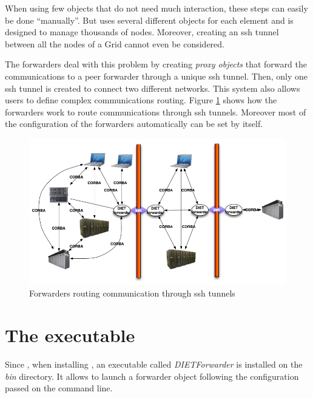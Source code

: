 When using few objects that do not need much interaction, these steps
can easily be done ``manually''. But \diet uses several different
objects for each element and is designed to manage thousands of nodes.
Moreover, creating an ssh tunnel between all the nodes of a Grid
cannot even be considered.

The \diet forwarders deal with this problem by creating \textit{proxy
  objects} that forward the communications to a peer forwarder through
a unique ssh tunnel. Then, only one ssh tunnel is created to connect
two different networks. This system also allows users to define complex
communications routing. Figure \ref{fig:forwarder} shows how the \diet
forwarders work to route communications through ssh tunnels. Moreover
most of the configuration of the forwarders automatically can be set
by \diet itself.

\begin{figure}[htp]
\begin{center}
  \includegraphics[width=12cm]{fig/Forwarder}
\end{center}
\caption{Forwarders routing \diet communication through ssh tunnels
  \label{fig:forwarder}}
\end{figure}

\section{The \dietforwarder executable}
\label{sec:ForwarderConfig}
Since , when installing \diet, an executable called \textit{DIETForwarder}
is installed on the \textit{bin} directory. It allows to launch a
forwarder object following the configuration passed on the command
line.
